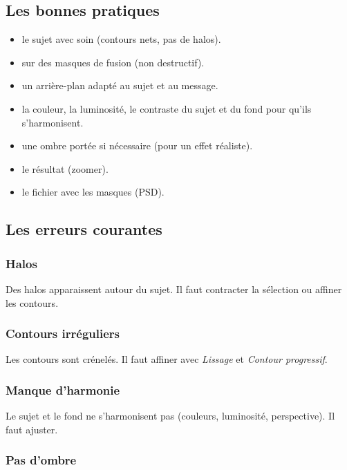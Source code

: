 \subsection{Les bonnes pratiques}

\begin{itemize}
    \item {} le sujet avec soin (contours nets, pas de halos).
    \item {} sur des masques de fusion (non destructif).
    \item {} un arrière-plan adapté au sujet et au message.
    \item {} la couleur, la luminosité, le contraste du sujet et du fond pour qu'ils s'harmonisent.
    \item {} une ombre portée si nécessaire (pour un effet réaliste).
    \item {} le résultat (zoomer).
    \item {} le fichier avec les masques (PSD).
\end{itemize}

\subsection{Les erreurs courantes}

\subsubsection{Halos}

Des halos apparaissent autour du sujet. Il faut contracter la sélection ou affiner les contours.

\subsubsection{Contours irréguliers}

Les contours sont crénelés. Il faut affiner avec \emph{Lissage} et \emph{Contour progressif}.

\subsubsection{Manque d'harmonie}

Le sujet et le fond ne s'harmonisent pas (couleurs, luminosité, perspective). Il faut ajuster.

\subsubsection{Pas d'ombre}

